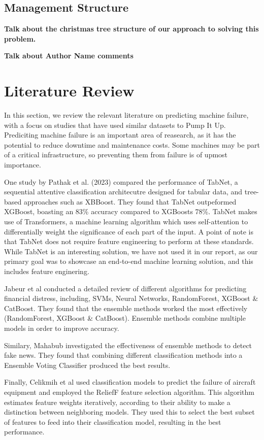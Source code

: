 \documentclass[conference]{IEEEtran}
\begin{document}
\subsection{Management Structure}

\textbf{Talk about the christmas tree structure of our approach to solving this problem.}

\textbf{Talk about Author Name comments}

\section{Literature Review}

In this section, we review the relevant literature on predicting machine failure, with a focus on studies that have used similar datasets to Pump It Up. Prediciting machine failure is an important area of reasearch, as it has the potential to reduce downtime and maintenance costs. Some machines may be part of a critical infrastructure, so preventing them from failure is of upmost importance.

One study by Pathak et al. (2023) \cite{pathak2023pump} compared the performance of TabNet, a sequential attentive classification architecutre designed for tabular data, and tree-based approaches such as XBBoost. They found that TabNet outpeformed XGBoost, boasting an 83\% accuracy compared to XGBoosts 78\%. TabNet makes use of Transformers, a machine learning algorithm which uses self-attention to differentially weight the significance of each part of the input. A point of note is that TabNet does not require feature engineering to perform at these standards. While TabNet is an interesting solution, we have not used it in our report, as our primary goal was to showcase an end-to-end machine learning solution, and this includes feature enginering.

Jabeur et al \cite{JABEUR2021} conducted a detailed review of different algorithms for predicting financial distress, including, SVMs, Neural Networks, RandomForest, XGBoost \& CatBoost. They found that the ensemble methods worked the most effectively (RandomForest, XGBoost \& CatBoost). Ensemble methods combine multiple models in order to improve accuracy. 

Similary, Mahabub \cite{Mahabub2020} investigated the effectiveness of ensemble methods to detect fake news. They found that combining different classification methods into a Ensemble Voting Classifier produced the best results.

Finally, Celikmih et al \cite{celikmih2020} used classification models to predict the failure of aircraft equipment and employed the ReliefF feature selection algorithm. This algorithm estimates feature weights iteratively, according to their ability to make a distinction between neighboring models. They used this to select the best subset of features to feed into their classification model, resulting in the best performance.
\end{document}

